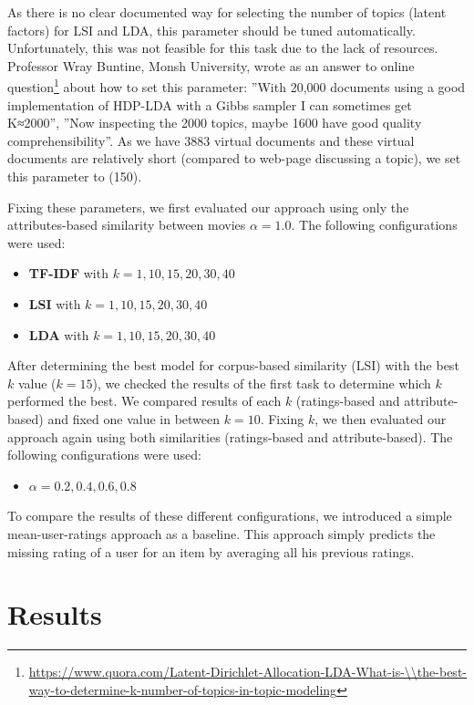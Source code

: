 \documentclass{sigish}
\begin{document}
As there is no clear documented way for selecting the number of topics (latent factors) for LSI and LDA, this parameter should be tuned automatically. Unfortunately, this was not feasible for this task due to the lack of resources. Professor Wray Buntine, Monsh University, wrote as an answer to online question\footnote{\url{https://www.quora.com/Latent-Dirichlet-Allocation-LDA-What-is-\\the-best-way-to-determine-k-number-of-topics-in-topic-modeling}} about how to set this parameter: ''With 20,000 documents using a good implementation of HDP-LDA with a Gibbs sampler I can sometimes get  K≈2000'', ''Now inspecting the 2000 topics, maybe 1600 have good quality comprehensibility''. As we have 3883 virtual documents and these virtual documents are relatively short (compared to web-page discussing a topic), we set this parameter to (150).

Fixing these parameters, we first evaluated our approach using only the attributes-based similarity between movies $ \alpha=1.0 $. The following configurations were used:
\begin{itemize}
\item \textbf{TF-IDF} with $ k = {1, 10, 15, 20, 30, 40} $
\item \textbf{LSI} with $ k = {1, 10, 15, 20, 30, 40} $
\item \textbf{LDA} with $ k = {1, 10, 15, 20, 30, 40} $
\end{itemize}

After determining the best model for corpus-based similarity (LSI) with the best $ k $ value ($ k = 15 $), we checked the results of the first task to determine which $ k $ performed the best. We compared results of each $ k $ (ratings-based and attribute-based) and fixed one value in between $ k=10 $. Fixing $ k $, we then evaluated our approach again using both similarities (ratings-based and attribute-based). The following configurations were used:
\begin{itemize}
\item $ \alpha = {0.2, 0.4, 0.6, 0.8} $
\end{itemize}

To compare the results of these different configurations, we introduced a simple mean-user-ratings approach as a baseline. This approach simply predicts the missing rating of a user for an item by averaging all his previous ratings.

\section{Results}
\end{document}
